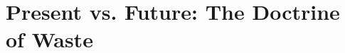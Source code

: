




\begin{questions}

\end{questions}



\section{Present vs. Future: The Doctrine of Waste}






\begin{questions}

\end{questions}



